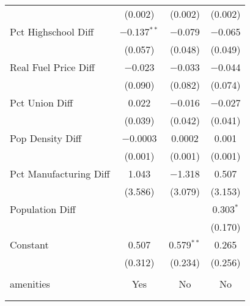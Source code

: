 \begin{table}[!htbp]
\begin{tabular}{@{\extracolsep{5pt}}lccc}
  & (0.002) & (0.002) & (0.002) \\ 
  Pct Highschool Diff & $-$0.137$^{**}$ & $-$0.079 & $-$0.065 \\ 
  & (0.057) & (0.048) & (0.049) \\ 
  Real Fuel Price Diff & $-$0.023 & $-$0.033 & $-$0.044 \\ 
  & (0.090) & (0.082) & (0.074) \\ 
  Pct Union Diff & 0.022 & $-$0.016 & $-$0.027 \\ 
  & (0.039) & (0.042) & (0.041) \\ 
  Pop Density Diff & $-$0.0003 & 0.0002 & 0.001 \\ 
  & (0.001) & (0.001) & (0.001) \\ 
  Pct Manufacturing Diff & 1.043 & $-$1.318 & 0.507 \\ 
  & (3.586) & (3.079) & (3.153) \\ 
  Population Diff &  &  & 0.303$^{*}$ \\ 
  &  &  & (0.170) \\ 
  Constant & 0.507 & 0.579$^{**}$ & 0.265 \\ 
  & (0.312) & (0.234) & (0.256) \\ 
 \hline \\[-1.8ex] 
amenities & Yes & No & No \\ 
\hline \\[-1.8ex] 
\hline 
\hline \\[-1.8ex] 
\end{tabular} 
\end{table} 
